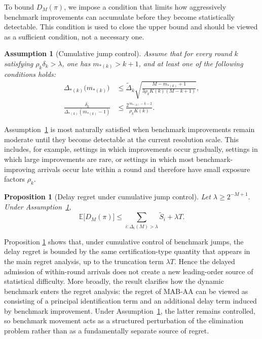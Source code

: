 \documentclass[
  12pt]{article}
\newtheorem{proposition}{Proposition}
\newtheorem{assumption}{Assumption}
\begin{document}
To bound \(D_M(\pi)\), we impose a condition that limits how aggressively benchmark
improvements can accumulate before they become statistically detectable. This condition is
used to close the upper bound and should be viewed as a sufficient condition, not a necessary
one.

\begin{assumption}[Cumulative jump control]\label{ass:delay_cum}
Assume that for every round $k$ satisfying $\rho_k\delta_k>\lambda$, one has $m_{*(k)}>k+1$,
and at least one of the following conditions holds:
\begin{align}
\Delta_{*(k)}\bigl(m_{*(k)}\bigr)
&\le
\tilde{\Delta}_k
\sqrt{
\frac{M-m_{*(k)}+1}{3\rho_k K(k)(M-k+1)}
},
\label{eq:delay-cond-1}
\\
\frac{\delta_k}{\Delta_{*(k)}(m_{*(k)}-1)}
&\le
\frac{2^{\,m_{*(k)}-k-2}}{\rho_k K(k)}.
\label{eq:delay-cond-2}
\end{align}
\end{assumption}
Assumption~\ref{ass:delay_cum} is most naturally satisfied when benchmark improvements remain moderate until
they become detectable at the current resolution scale. This includes, for example, settings in
which improvements occur gradually, settings in which large improvements are rare, or settings
in which most benchmark-improving arrivals occur late within a round and therefore have
small exposure factors \(\rho_k\).

\begin{proposition}[Delay regret under cumulative jump control]\label{prop:delay_cum}
Let
\(
\lambda\ge 2^{-M+1}.
\)
Under Assumption~\ref{ass:delay_cum},
\[
\mathbb{E}\bigl[D_M(\pi)\bigr]
\le
\sum_{i:\Delta_i(M)>\lambda}\tilde S_i+\lambda T.
\]
\end{proposition}

Proposition \ref{prop:delay_cum} shows that, under cumulative control of benchmark jumps, the delay regret is bounded by the same certification-type quantity that appears in the main regret analysis, up to the truncation term $\lambda T$. Hence the delayed admission of within-round arrivals does not create a new leading-order source of statistical difficulty. More broadly, the result clarifies how the dynamic benchmark enters the regret analysis: the regret of MAB-AA can be viewed as consisting of a principal identification term and an additional delay term induced by benchmark improvement. Under Assumption~\ref{ass:delay_cum}, the latter remains controlled, so benchmark movement acts as a structured perturbation of the elimination problem rather than as a fundamentally separate source of regret.
\end{document}

